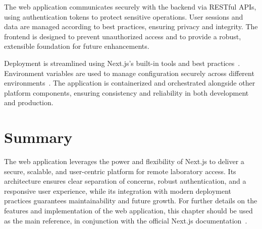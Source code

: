 The web application communicates securely with the backend via RESTful APIs, using authentication tokens to protect sensitive operations. User sessions and data are managed according to best practices, ensuring privacy and integrity. The frontend is designed to prevent unauthorized access and to provide a robust, extensible foundation for future enhancements.

Deployment is streamlined using Next.js's built-in tools and best practices~\cite{nextjs-deployment}. Environment variables are used to manage configuration securely across different environments~\cite{nextjs-env-vars}. The application is containerized and orchestrated alongside other platform components, ensuring consistency and reliability in both development and production.

\section{Summary}

The web application leverages the power and flexibility of Next.js to deliver a secure, scalable, and user-centric platform for remote laboratory access. Its architecture ensures clear separation of concerns, robust authentication, and a responsive user experience, while its integration with modern deployment practices guarantees maintainability and future growth. For further details on the features and implementation of the web application, this chapter should be used as the main reference, in conjunction with the official Next.js documentation~\cite{nextjs-docs}. 